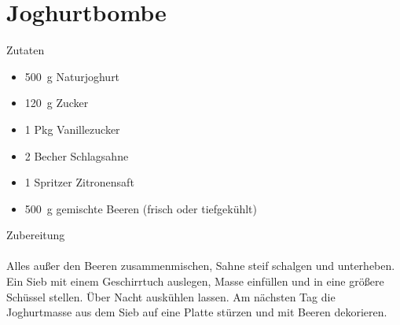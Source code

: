 \section*{Joghurtbombe}
\ihead{}\ohead{}
\cfoot{}
{\Large Zutaten}
\begin{multicols}{2}
\begin{itemize}
    \item \SI{500}{g} Naturjoghurt
    \item \SI{120}{g} Zucker
    \item \num{1} Pkg Vanillezucker
    \item \num{2} Becher Schlagsahne
    \item \num{1} Spritzer Zitronensaft
    \item \SI{500}{g} gemischte Beeren (frisch oder tiefgekühlt)
\end{itemize}
\end{multicols}
\noindent
{\Large Zubereitung}\\
\\
Alles außer den Beeren zusammenmischen, Sahne steif schalgen und unterheben.
Ein Sieb mit einem Geschirrtuch auslegen, Masse einfüllen und in eine größere Schüssel stellen. 
Über Nacht auskühlen lassen. 
Am nächsten Tag die Joghurtmasse aus dem Sieb auf eine Platte stürzen und mit Beeren dekorieren.